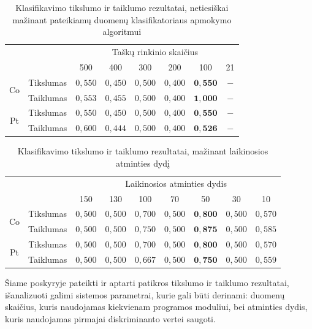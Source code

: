 \documentclass[]{vgtuef}
\begin{document}
\begin{table}
	\centering
	\caption{Klasifikavimo tikslumo ir taiklumo rezultatai, netiesiškai mažinant pateikiamų duomenų klasifikatoriaus apmokymo algoritmui}
	\label{table:second_phase_not_linear_experiment}
	\begin{tabular}{|c|c|c|c|c|c|c|c|} \hline
			& & \multicolumn{6}{c|}{Taškų rinkinio skaičius} \\ \cline{3-8}
						&	& 500 	& 400	& 300 	& 200 & 100 	& 21 	\\ \hline
		\multirow{2}{*}{Co}
		& Tikslumas	& $0,550$ & $0,450$ & $0,500$ & $0,400$ & $\mathbf{0,550}$ & $-$ \\ \cline{2-8}
		& Taiklumas  &	$0,553$ & $0,455$ & $0,500$ & $0,400$ & $\mathbf{1,000}$ & $-$ \\ \hline
		\multirow{2}{*}{Pt}
		& Tikslumas	& $0,550$ & $0,450$ & $0,500$ & $0,400$ & $\mathbf{0,550}$ & $-$ \\ \cline{2-8}
		& Taiklumas  &	$0,600$ & $0,444$ & $0,500$ & $0,400$ & $\mathbf{0,526}$ & $-$ \\ \hline
	\end{tabular}
\end{table}

\begin{table}
	\centering
	\caption{Klasifikavimo tikslumo ir taiklumo rezultatai, mažinant laikinosios atminties dydį}
	\label{table:memory_linear_experiment}
	\begin{tabular}{|c|c|c|c|c|c|c|c|c|} \hline
			& & \multicolumn{7}{c|}{Laikinosios atminties dydis} \\ \cline{3-9}
						&	& 150 & 130 & 100 & 70 & 50 & 30 & 10\\ \hline
		\multirow{2}{*}{Co}
		& Tikslumas	& $0,500$ & $0,500$ & $0,700$ & $0,500$ & $\mathbf{0,800}$ & $0,500$ & $0,570$ \\ \cline{2-9}
		& Taiklumas  &	$0,500$ & $0,500$ & $0,750$ & $0,500$ & $\mathbf{0,875}$ & $0,500$ & $0,585$ \\ \hline
		\multirow{2}{*}{Pt}
		& Tikslumas	& $0,500$ & $0,500$ & $0,700$ & $0,500$ & $\mathbf{0,800}$ & $0,500$ & $0,570$ \\ \cline{2-9}
		& Taiklumas  &	$0,500$ & $0,500$ & $0,667$ & $0,500$ & $\mathbf{0,750}$ & $0,500$ & $0,559$ \\ \hline
	\end{tabular}
\end{table}

Šiame poskyryje pateikti ir aptarti patikros tikslumo ir taiklumo rezultatai, išanalizuoti galimi sistemos parametrai, kurie gali būti derinami: duomenų skaičius, kuris naudojamas kiekvienam programos moduliui, bei atminties dydis, kuris naudojamas pirmajai diskriminanto vertei saugoti.
\end{document}
